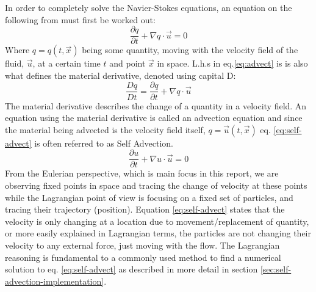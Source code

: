 In order to completely solve the Navier-Stokes equations, an equation on the following from must first be worked out:
\begin{equation}\label{eq:advect}\frac{\partial q}{\partial t} +\nabla q \cdot \vec{u}= 0\end{equation}
Where \begin{math}q= q(t,\vec{x})\end{math} being some quantity, moving with the velocity field of the fluid, \begin{math}\vec{u}\end{math}, at a certain time \begin{math}t\end{math} and point \begin{math}\vec{x}\end{math} in space. L.h.s in eq.\ref{eq:advect} is is also what defines the material derivative, denoted using capital D:
\begin{equation}\frac{Dq}{Dt} = \frac{\partial q}{\partial t} +\nabla q \cdot \vec{u}\end{equation}
The material derivative describes the change of a quantity in a velocity field. An equation using the material derivative is called an advection equation and since the material being advected is the velocity field itself, \begin{math}q = \vec{u}(t,\vec{x})\end{math} eq. \ref{eq:self-advect} is often referred to as Self Advection.
\begin{equation}\label{eq:self-advect}\frac{\partial u}{\partial t} +\nabla u \cdot \vec{u}= 0\end{equation}
From the Eulerian perspective, which is main focus in this report, we are observing fixed points in space and tracing the change of velocity at these points while the Lagrangian point of view is focusing on a fixed set of particles, and tracing their trajectory (position). Equation \ref{eq:self-advect} states that the velocity is only changing at a location due to movement/replacement of quantity, or more easily explained in Lagrangian terms, the particles are not changing their velocity to any external force, just moving with the flow. The Lagrangian reasoning is fundamental to a commonly used method to find a numerical solution to eq. \ref{eq:self-advect} as described in more detail in section \ref{sec:self-advection-implementation}.
